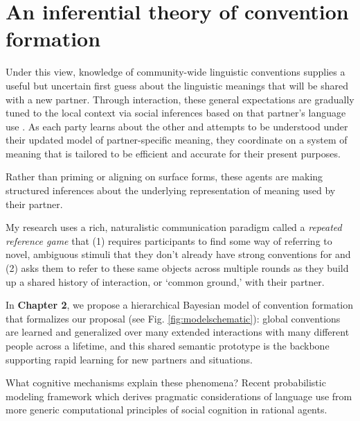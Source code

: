 \documentclass[11pt]{article}
\begin{document}


\section*{An inferential theory of convention formation}

Under this view, knowledge of community-wide linguistic conventions \cite{Lewis69_Convention} supplies a useful but uncertain first guess about the linguistic meanings that will be shared with a new partner. 
Through interaction, these general expectations are gradually tuned to the local context via social inferences based on that partner's language use  \cite{clark_using_1996,davidson_nice_1986}. 
As each party learns about the other and attempts to be understood under their updated model of partner-specific meaning, they coordinate on a system of meaning that is tailored to be efficient and accurate for their present purposes.

Rather than priming or aligning on surface forms, these agents are making structured inferences about the underlying representation of meaning used by their partner.

My research uses a rich, naturalistic communication paradigm called a \emph{repeated reference game} that (1) requires participants to find some way of referring to novel, ambiguous stimuli that they don't already have strong conventions for and (2) asks them to refer to these same objects across multiple rounds as they build up a shared history of interaction, or `common ground,' with their partner.

In \textbf{Chapter 2}, we propose a hierarchical Bayesian model of convention formation that formalizes our proposal (see Fig. \ref{fig:modelschematic}): global conventions are learned and generalized over many extended interactions with many different people across a lifetime, and this shared semantic prototype is the backbone supporting rapid learning for new partners and situations. 

What cognitive mechanisms explain these phenomena? 
Recent probabilistic modeling framework which derives pragmatic considerations of language use from more generic computational principles of social cognition in rational agents.
\end{document}
